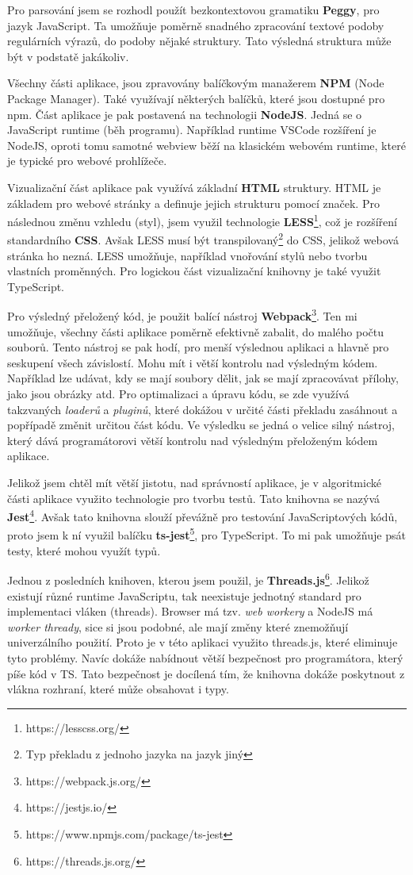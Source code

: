 Pro parsování jsem se rozhodl použít bezkontextovou gramatiku \textbf{Peggy}\cite{Peggy, Peggyjs}, pro jazyk JavaScript.
Ta umožňuje poměrně snadného zpracování textové podoby regulárních výrazů, do podoby nějaké struktury.
Tato výsledná struktura může být v podstatě jakákoliv.

Všechny části aplikace, jsou zpravovány balíčkovým manažerem \textbf{NPM} (Node Package Manager).
Také využívají některých balíčků, které jsou dostupné pro npm. 
Část aplikace je pak postavená na technologii \textbf{NodeJS}.
Jedná se o JavaScript runtime (běh programu). 
Například runtime VSCode rozšíření je NodeJS, oproti tomu samotné webview běží na klasickém webovém runtime, které je typické pro webové prohlížeče.

Vizualizační část aplikace pak využívá základní \textbf{HTML} struktury.  
HTML je základem pro webové stránky a definuje jejich strukturu pomocí značek.
Pro následnou změnu vzhledu (styl), jsem využil technologie \textbf{LESS}\footnote{https://lesscss.org/}, což je rozšíření standardního \textbf{CSS}.
Avšak LESS musí být transpilovaný\footnote{Typ překladu z jednoho jazyka na jazyk jiný} do CSS, jelikož webová stránka ho nezná. 
LESS umožňuje, například vnořování stylů nebo tvorbu vlastních proměnných.
Pro logickou část vizualizační knihovny je také využit TypeScript.

Pro výsledný přeložený kód, je použit balící nástroj \textbf{Webpack}\footnote{https://webpack.js.org/}.
Ten mi umožňuje, všechny části aplikace poměrně efektivně zabalit, do malého počtu souborů. 
Tento nástroj se pak hodí, pro menší výslednou aplikaci a hlavně pro seskupení všech závislostí.
Mohu mít i větší kontrolu nad výsledným kódem.
Například lze udávat, kdy se mají soubory dělit, jak se mají zpracovávat přílohy, jako jsou obrázky atd.
Pro optimalizaci a úpravu kódu, se zde využívá takzvaných \textit{loaderů} a \textit{pluginů}, 
které dokážou v určité části překladu zasáhnout a popřípadě změnit určitou část kódu.
Ve výsledku se jedná o velice silný nástroj, který dává programátorovi větší kontrolu nad výsledným přeloženým kódem aplikace.

Jelikož jsem chtěl mít větší jistotu, nad správností aplikace, je v algoritmické části aplikace využito technologie pro tvorbu testů. 
Tato knihovna se nazývá \textbf{Jest}\footnote{https://jestjs.io/}.
Avšak tato knihovna slouží převážně pro testování JavaScriptových kódů, proto jsem k ní využil balíčku \textbf{ts-jest}\footnote{https://www.npmjs.com/package/ts-jest}, pro TypeScript.
To mi pak umožňuje psát testy, které mohou využít typů.

Jednou z posledních knihoven, kterou jsem použil, je \textbf{Threads.js}\footnote{https://threads.js.org/}. 
Jelikož existují různé runtime JavaScriptu, tak neexistuje jednotný standard pro implementaci vláken (threads).
Browser má tzv. \textit{web workery} a NodeJS má \textit{worker thready}, sice si jsou podobné, ale mají změny které znemožňují univerzálního použití.
Proto je v této aplikaci využito threads.js, které eliminuje tyto problémy.
Navíc dokáže nabídnout větší bezpečnost pro programátora, který píše kód v TS. 
Tato bezpečnost je docílená tím, že knihovna dokáže poskytnout z vlákna rozhraní, které může obsahovat i typy.

\endinput